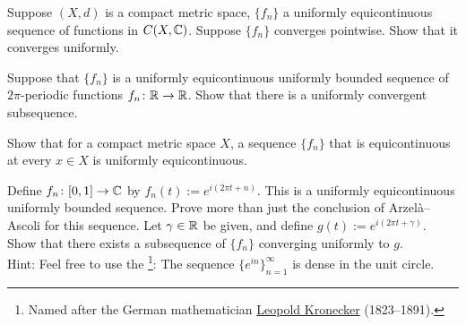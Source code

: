 \begin{exercise}
Suppose $(X,d)$ is a compact metric space, $\{ f_n \}$ a uniformly equicontinuous
sequence of functions in $C(X,{\mathbb{C}})$.  Suppose $\{ f_n \}$ converges
pointwise.  Show that it converges uniformly.
\end{exercise}

\begin{exercise}
Suppose that $\{ f_n \}$ is a uniformly equicontinuous uniformly bounded sequence of
$2\pi$-periodic functions $f_n \colon {\mathbb{R}} \to {\mathbb{R}}$.  Show that there is a
uniformly convergent subsequence.
\end{exercise}

\begin{exercise}
Show that for a compact metric space $X$,
a sequence $\{ f_n \}$ that is equicontinuous at every $x \in X$
is uniformly equicontinuous.
\end{exercise}

\begin{exercise}
Define $f_n \colon [0,1] \to {\mathbb{C}}$ by $f_n(t) := e^{i(2\pi t + n)}$.
This is a uniformly equicontinuous uniformly bounded sequence.
Prove more than just
the conclusion of Arzel\`a--Ascoli for this sequence.  Let $\gamma \in {\mathbb{R}}$
be given,
and define $g(t) := e^{i(2\pi t + \gamma)}$.  Show that there exists 
a subsequence of $\{ f_n \}$ converging uniformly to $g$.
\\
Hint: Feel free to use the \emph{}\footnote{%
Named after the German mathematician
\href{https://en.wikipedia.org/wiki/Leopold_Kronecker}{Leopold Kronecker}
(1823--1891).}:
The sequence $\{ e^{in} \}_{n=1}^\infty$ is dense in the unit circle.
\end{exercise}

